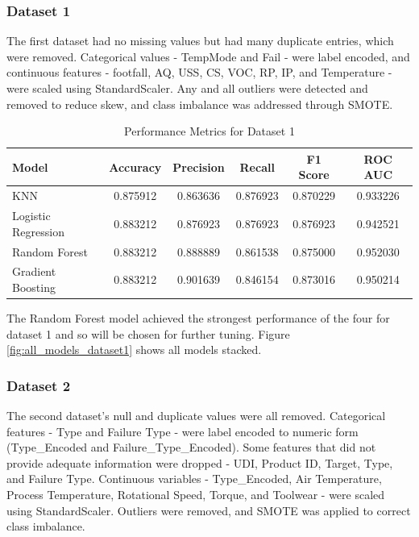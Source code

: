 \documentclass[11pt]{article}
\begin{document}
\subsubsection{Dataset 1}
The first dataset had no missing values but had many duplicate entries, which were removed. Categorical values - TempMode and Fail - were label encoded, and continuous features - footfall, AQ, USS, CS, VOC, RP, IP, and Temperature - were scaled using StandardScaler. Any and all outliers were detected and removed to reduce skew, and class imbalance was addressed through SMOTE.

\begin{table}[h!]
\centering
\begin{tabular}{l c c c c c}
\hline
\textbf{Model} & \textbf{Accuracy} & \textbf{Precision} & \textbf{Recall} & \textbf{F1 Score} & \textbf{ROC AUC} \\ 
\hline
KNN                 & 0.875912 & 0.863636 & 0.876923 & 0.870229 & 0.933226 \\
Logistic Regression & 0.883212 & 0.876923 & 0.876923 & 0.876923 & 0.942521 \\
Random Forest       & 0.883212 & 0.888889 & 0.861538 & 0.875000 & 0.952030 \\
Gradient Boosting   & 0.883212 & 0.901639 & 0.846154 & 0.873016 & 0.950214 \\

\hline
\end{tabular}
\caption{Performance Metrics for Dataset 1}
\label{tab:model_performance1}
\end{table}

The Random Forest model achieved the strongest performance of the four for dataset 1 and so will be chosen for further tuning. Figure \ref{fig:all_models_dataset1} shows all models stacked.

\subsubsection{Dataset 2}
The second dataset's null and duplicate values were all removed. Categorical features - Type and Failure Type - were label encoded to numeric form (Type\_Encoded and Failure\_Type\_Encoded). Some features that did not provide adequate information were dropped - UDI, Product ID, Target, Type, and Failure Type. Continuous variables - Type\_Encoded, Air Temperature, Process Temperature, Rotational Speed, Torque, and Toolwear - were scaled using StandardScaler. Outliers were removed, and SMOTE was applied to correct class imbalance.
\end{document}
